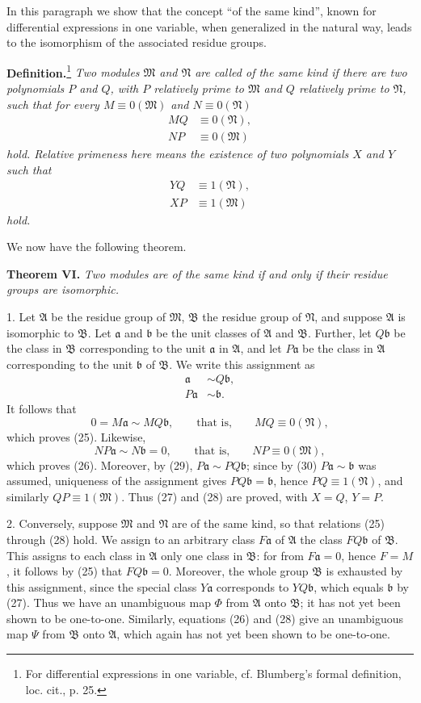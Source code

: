 \documentclass[11pt]{article}
\newcommand{\mM}{\mathfrak{M}}
\newcommand{\mN}{\mathfrak{N}}
\newcommand{\mA}{\mathfrak{A}}
\newcommand{\mB}{\mathfrak{B}}
\newcommand{\ma}{\mathfrak{a}}
\newcommand{\mb}{\mathfrak{b}}
\begin{document}
In this paragraph we show that the concept ``of the same kind'', known for differential expressions in one variable, when generalized in the natural way, leads to the isomorphism of the associated residue groups.

\textbf{Definition.}\footnote{For differential expressions in one variable, cf. Blumberg's formal definition, loc. cit., p. 25.} \emph{Two modules $\mM$ and $\mN$ are called of the same kind if there are two polynomials $P$ and $Q$, with $P$ relatively prime to $\mM$ and $Q$ relatively prime to $\mN$, such that for every $M\equiv0(\mM)$ and $N\equiv0(\mN)$}
\begin{align}
 MQ&\equiv0(\mN),\tag{25}\\
 NP&\equiv0(\mM)\tag{26}
\end{align}
\emph{hold. Relative primeness here means the existence of two polynomials $X$ and $Y$ such that}
\begin{align}
 YQ&\equiv1(\mN),\tag{27}\\
 XP&\equiv1(\mM)\tag{28}
\end{align}
\emph{hold.}

We now have the following theorem.

\textbf{Theorem VI.} \emph{Two modules are of the same kind if and only if their residue groups are isomorphic.}

1. Let $\mA$ be the residue group of $\mM$, $\mB$ the residue group of $\mN$, and suppose $\mA$ is isomorphic to $\mB$. Let $\ma$ and $\mb$ be the unit classes of $\mA$ and $\mB$. Further, let $Q\mb$ be the class in $\mB$ corresponding to the unit $\ma$ in $\mA$, and let $P\ma$ be the class in $\mA$ corresponding to the unit $\mb$ of $\mB$. We write this assignment as
\begin{align}
 \ma&\sim Q\mb,\tag{29}\\
 P\ma&\sim\mb.\tag{30}
\end{align}
It follows that
\[
 0=M\ma\sim MQ\mb,
 \qquad\text{that is,}\qquad MQ\equiv0(\mN),
\]
which proves (25). Likewise,
\[
 NP\ma\sim N\mb=0,
 \qquad\text{that is,}\qquad NP\equiv0(\mM),
\]
which proves (26). Moreover, by (29), $P\ma\sim PQ\mb$; since by (30) $P\ma\sim\mb$ was assumed, uniqueness of the assignment gives $PQ\mb=\mb$, hence $PQ\equiv1(\mN)$, and similarly $QP\equiv1(\mM)$. Thus (27) and (28) are proved, with $X=Q$, $Y=P$.

2. Conversely, suppose $\mM$ and $\mN$ are of the same kind, so that relations (25) through (28) hold. We assign to an arbitrary class $F\ma$ of $\mA$ the class $FQ\mb$ of $\mB$. This assigns to each class in $\mA$ only one class in $\mB$: for from $F\ma=0$, hence $F=M$, it follows by (25) that $FQ\mb=0$. Moreover, the whole group $\mB$ is exhausted by this assignment, since the special class $Y\ma$ corresponds to $YQ\mb$, which equals $\mb$ by (27). Thus we have an unambiguous map $\Phi$ from $\mA$ onto $\mB$; it has not yet been shown to be one-to-one. Similarly, equations (26) and (28) give an unambiguous map $\Psi$ from $\mB$ onto $\mA$, which again has not yet been shown to be one-to-one.
\end{document}
